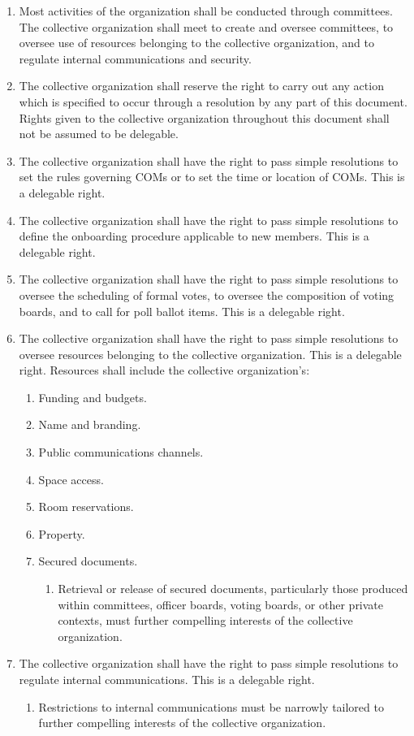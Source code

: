\documentclass[11pt]{article}
\newcounter{h1}
\newcounter{h2}[h1]
\newcounter{h3}[h2]
\begin{document}
\begin{enumerate}
  \item Most activities of the organization shall be conducted through committees. The collective organization shall meet to create and oversee committees, to oversee use of resources belonging to the collective organization, and to regulate internal communications and security.
  \item The collective organization shall reserve the right to carry out any action which is specified to occur through a resolution by any part of this document. Rights given to the collective organization throughout this document shall not be assumed to be delegable.
  \item The collective organization shall have the right to pass simple resolutions to set the rules governing COMs or to set the time or location of COMs. This is a delegable right.
  \item The collective organization shall have the right to pass simple resolutions to define the onboarding procedure applicable to new members. This is a delegable right.
  \item The collective organization shall have the right to pass simple resolutions to oversee the scheduling of formal votes, to oversee the composition of voting boards, and to call for poll ballot items. This is a delegable right.
  \item The collective organization shall have the right to pass simple resolutions to oversee resources belonging to the collective organization. This is a delegable right. Resources shall include the collective organization's:
  \begin{enumerate}
    \item Funding and budgets.
    \item Name and branding.
    \item Public communications channels.
    \item Space access.
    \item Room reservations.
    \item Property.
    \item Secured documents.
    \begin{enumerate}
      \item Retrieval or release of secured documents, particularly those produced within committees, officer boards, voting boards, or other private contexts, must further compelling interests of the collective organization.
    \end{enumerate}
  \end{enumerate}
  \item The collective organization shall have the right to pass simple resolutions to regulate internal communications. This is a delegable right.
  \begin{enumerate}
    \item Restrictions to internal communications must be narrowly tailored to further compelling interests of the collective organization.
  \end{enumerate}
\end{enumerate}
\end{document}

